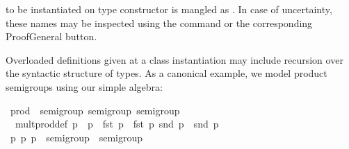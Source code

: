 \begin{isabellebody}
\begin{isamarkuptext}
   to be instantiated on type constructor  is
  mangled as .  In case of uncertainty, these names may be
  inspected using the \hyperlink{command.print-context}{\mbox{}} command or the
  corresponding ProofGeneral button.%
\end{isamarkuptext}%
\isamarkuptrue%
%
\isamarkuptrue%
%
\begin{isamarkuptext}%
Overloaded definitions given at a class instantiation may include
  recursion over the syntactic structure of types.  As a canonical
  example, we model product semigroups using our simple algebra:%
\end{isamarkuptext}%
\isamarkuptrue%
%
\isadelimquote
%
\endisadelimquote
%
\isatagquote
{}\isamarkupfalse%
\ prod\ {}{}\ {}semigroup{}\ semigroup{}\ semigroup\isanewline
{}\isanewline
\isanewline
{}\isamarkupfalse%
\isanewline
\ \ mult{}prod{}def{}\ {}p\ {}\ p\ {}\ {}fst\ p\ {}\ fst\ p\ snd\ p\ {}\ snd\ p\isanewline
\isanewline
{}\isamarkupfalse%
\ \isamarkupfalse%
\isanewline
\ \ \isamarkupfalse%
\ p\ p\ p\ {}{}\ {}{}{}semigroup\ {}\ {}{}semigroup{}\isanewline

\end{isabellebody}
